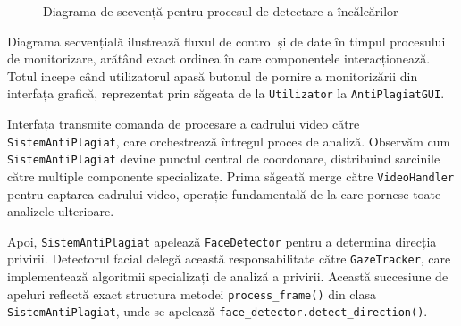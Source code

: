 \documentclass[12pt,a4paper]{article}
\begin{document}
\begin{figure}[H]
        \caption{Diagrama de secvență pentru procesul de detectare a încălcărilor}
    \end{figure}

Diagrama secvențială ilustrează fluxul de control și de date în timpul procesului de monitorizare, arătând exact ordinea în care componentele interacționează. Totul incepe când utilizatorul apasă butonul de pornire a monitorizării din interfața grafică, reprezentat prin săgeata de la \texttt{Utilizator} la \texttt{AntiPlagiatGUI}.

Interfața transmite comanda de procesare a cadrului video către \texttt{SistemAntiPlagiat}, care orchestrează întregul proces de analiză. Observăm cum \texttt{SistemAntiPlagiat} devine punctul central de coordonare, distribuind sarcinile către multiple componente specializate. Prima săgeată merge către \texttt{VideoHandler} pentru captarea cadrului video, operație fundamentală de la care pornesc toate analizele ulterioare.

Apoi, \texttt{SistemAntiPlagiat} apelează \texttt{FaceDetector} pentru a determina direcția privirii. Detectorul facial delegă această responsabilitate către \texttt{GazeTracker}, care implementează algoritmii specializați de analiză a privirii. Această succesiune de apeluri reflectă exact structura metodei \texttt{process\_frame()} din clasa \texttt{SistemAntiPlagiat}, unde se apelează \texttt{face\_detector.detect\_direction()}.
\end{document}
